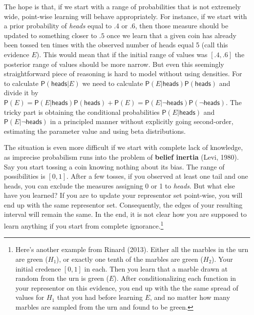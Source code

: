 \documentclass[
  10pt,
  dvipsnames,enabledeprecatedfontcommands]{scrartcl}
\newcommand{\pr}[1]{\mathsf{P}(#1)}
\newcommand{\s}[1]{\mbox{$\mathsf{#1}$}}
\begin{document}
\noindent The hope is that, if we start with a range of probabilities
that is not extremely wide, point-wise learning will behave
appropriately. For instance, if we start with a prior probability of
\emph{heads} equal to .4 or .6, then those measure should be updated to
something closer to \(.5\) once we learn that a given coin has already
been tossed ten times with the observed number of heads equal 5 (call
this evidence \(E\)). This would mean that if the initial range of
values was \([.4,.6]\) the posterior range of values should be more
narrow. But even this seemingly straightforward piece of reasoning is
hard to model without using densities. For to calculate
\(\pr{\s{heads}\vert E}\) we need to calculate
\(\pr{E \vert \s{heads}}\pr{\s{heads}}\) and divide it by
\(\pr{E} = \pr{E \vert \s{heads}}\pr{\s{heads}} + \pr{E} = \pr{E \vert \neg \s{heads}}\pr{\neg \s{heads}}\).
The tricky part is obtaining the conditional probabilities
\(\pr{E \vert \s{heads}}\) and \(\pr{E \vert \neg \s{heads}}\) in a
principled manner without explicitly going second-order, estimating the
parameter value and using beta distributions.

The situation is even more difficult if we start with complete lack of
knowledge, as imprecise probabilism runs into the problem of
\textbf{belief inertia} (Levi, 1980). Say you start tossing a coin
knowing nothing about its bias. The range of possibilities is \([0,1]\).
After a few tosses, if you observed at least one tail and one heads, you
can exclude the measures assigning 0 or 1 to \emph{heads}. But what else
have you learned? If you are to update your representor set point-wise,
you will end up with the same representor set. Consequently, the edges
of your resulting interval will remain the same. In the end, it is not
clear how you are supposed to learn anything if you start from complete
ignorance.\footnote{Here's another example from Rinard (2013). Either
  all the marbles in the urn are green (\(H_1\)), or exactly one tenth
  of the marbles are green (\(H_2\)). Your initial credence \([0,1]\) in
  each. Then you learn that a marble drawn at random from the urn is
  green (\(E\)). After conditionalizing each function in your
  representor on this evidence, you end up with the the same spread of
  values for \(H_1\) that you had before learning \(E\), and no matter
  how many marbles are sampled from the urn and found to be green.}
\end{document}
